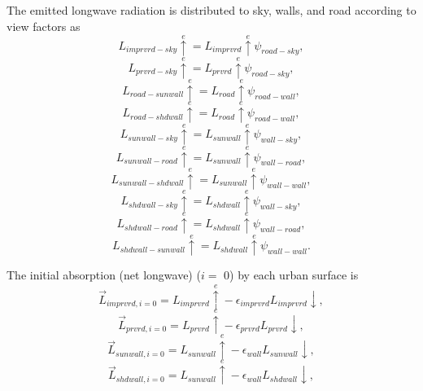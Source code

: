 \documentclass[12pt,authoryear]{elsarticle}
\numberwithin{equation}{section} %
\begin{document}
The emitted longwave radiation is distributed to sky, walls, and road according to view factors as
\begin{equation}
L_{imprvrd-sky}\overset{e}{\uparrow} = L_{imprvrd}\overset{e}{\uparrow}\psi_{road-sky},
\end{equation}
\begin{equation}
L_{prvrd-sky}\overset{e}{\uparrow} = L_{prvrd}\overset{e}{\uparrow}\psi_{road-sky},
\end{equation}
\begin{equation}
L_{road-sunwall}\overset{e}{\uparrow} = L_{road}\overset{e}{\uparrow}\psi_{road-wall},
\end{equation}
\begin{equation}
L_{road-shdwall}\overset{e}{\uparrow} = L_{road}\overset{e}{\uparrow}\psi_{road-wall},
\end{equation}
\begin{equation}
L_{sunwall-sky}\overset{e}{\uparrow} = L_{sunwall}\overset{e}{\uparrow}\psi_{wall-sky},
\end{equation}
\begin{equation}
L_{sunwall-road}\overset{e}{\uparrow} = L_{sunwall}\overset{e}{\uparrow}\psi_{wall-road},
\end{equation}
\begin{equation}
L_{sunwall-shdwall}\overset{e}{\uparrow} = L_{sunwall}\overset{e}{\uparrow}\psi_{wall-wall},
\end{equation}
\begin{equation}
L_{shdwall-sky}\overset{e}{\uparrow} = L_{shdwall}\overset{e}{\uparrow}\psi_{wall-sky},
\end{equation}
\begin{equation}
L_{shdwall-road}\overset{e}{\uparrow} = L_{shdwall}\overset{e}{\uparrow}\psi_{wall-road},
\end{equation}
\begin{equation}
L_{shdwall-sunwall}\overset{e}{\uparrow} = L_{shdwall}\overset{e}{\uparrow}\psi_{wall-wall}.
\end{equation}

The initial absorption (net longwave) ($i =$ 0) by each urban surface is
\begin{equation}
\overrightarrow{L}_{imprvrd,i=0}=L_{imprvrd}\overset{e}{\uparrow}-\epsilon_{imprvrd}L_{imprvrd}\downarrow,
\end{equation}
\begin{equation}
\overrightarrow{L}_{prvrd,i=0}=L_{prvrd}\overset{e}{\uparrow}-\epsilon_{prvrd}L_{prvrd}\downarrow,
\end{equation}
\begin{equation}
\overrightarrow{L}_{sunwall,i=0}=L_{sunwall}\overset{e}{\uparrow}-\epsilon_{wall}L_{sunwall}\downarrow,
\end{equation}
\begin{equation}
\overrightarrow{L}_{shdwall,i=0}=L_{sunwall}\overset{e}{\uparrow}-\epsilon_{wall}L_{shdwall}\downarrow,
\end{equation}
\end{document}
